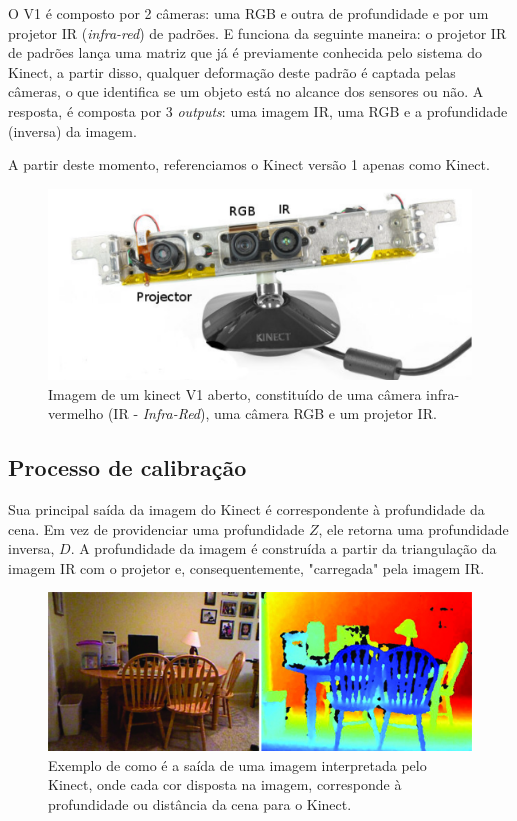 O V1 é composto por 2 câmeras: uma RGB e outra de profundidade e por um projetor IR (\emph{infra-red}) de padrões. E funciona da seguinte maneira: o projetor IR de padrões lança uma matriz que já é previamente conhecida pelo sistema do Kinect, a partir disso, qualquer deformação deste padrão é captada pelas câmeras, o que identifica se um objeto está no alcance dos sensores ou não. A resposta, é composta por 3 \emph{outputs}: uma imagem IR,  uma RGB e a profundidade (inversa) da imagem. 

A partir deste momento, referenciamos o Kinect versão 1 apenas como Kinect.

\begin{figure}[!h]
	\centering
	\includegraphics[width=0.5\linewidth]{figs/kinect.png}
	\caption{%
	Imagem de um kinect V1 aberto, constituído de uma câmera infra-vermelho (IR - \emph{Infra-Red}), uma câmera RGB e um projetor IR.
	}\label{fig:kinect}
\end{figure}

\subsection*{Processo de calibração}

Sua principal saída da imagem do Kinect é correspondente à profundidade da cena. Em vez de providenciar uma profundidade $Z$, ele retorna uma profundidade inversa, $D$.
A profundidade da imagem é construída a partir da triangulação da imagem IR com o projetor e, consequentemente, "carregada" pela imagem IR.

\begin{figure}[!h]
	\centering
	\includegraphics[width=1\linewidth]{figs/profundidadekinect.png}
	\caption{%
	Exemplo de como é a saída de uma imagem interpretada pelo Kinect, onde cada cor disposta na imagem, corresponde à profundidade ou distância da cena para o Kinect.
	}\label{fig:profKinect}
\end{figure}
 
